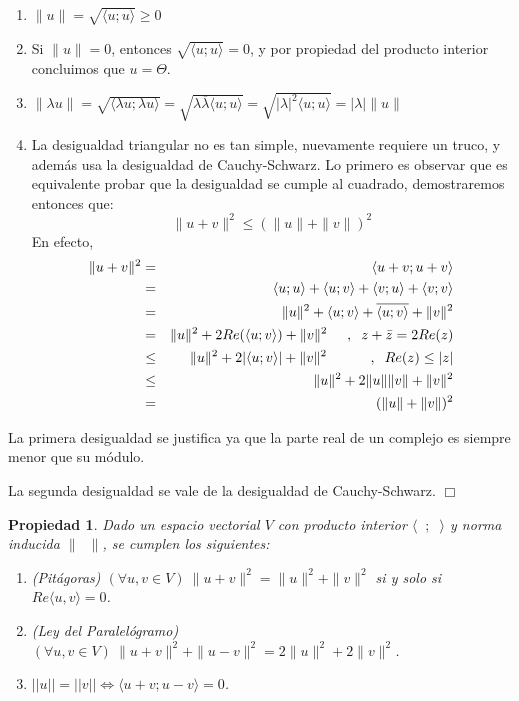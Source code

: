 \documentclass[12pt]{book}
\newtheorem{prop}{Propiedad}
\begin{document}
{ \begin{enumerate}
  \item $\|u\|=\sqrt{\langle u;u\rangle}\ge0$
  \item Si $\|u\|=0$, entonces $\sqrt{\langle u;u\rangle}=0$, y por propiedad del producto interior concluimos que $u=\Theta$.
  \item $\|\lambda u\|=\sqrt{\langle \lambda u;\lambda u\rangle}=\sqrt{\lambda\overline{\lambda}\langle  u; u\rangle}=\sqrt{|\lambda|^2\langle u;u\rangle}=|\lambda|\| u\|$
  \item La desigualdad triangular no es tan simple, nuevamente requiere un truco, y además usa la desigualdad de Cauchy-Schwarz.
    Lo primero es observar que es equivalente probar que la desigualdad se cumple al cuadrado, demostraremos entonces que:
    $$\|u+v\|^2\le (\|u\|+\|v\|)^2$$
    En efecto,
    \begin{eqnarray*}
      \|u+v\|^2&=&\langle u+v;u+v\rangle\\
      &=&\langle u;u\rangle+\langle u;v\rangle+\langle v;u\rangle+\langle v;v\rangle\\
      &=&\|u\|^2+\langle u;v\rangle+\overline{\langle u;v\rangle}+\|v\|^2\\
      &=&\|u\|^2+2Re(\langle u;v\rangle)+\|v\|^2\hspace{0.5 cm},\hspace{0.2 cm}z+\bar{z}=2Re(z)\\
      &\le&\|u\|^2+2|\langle u;v\rangle|+\|v\|^2\hspace{1.1 cm},\hspace{0.2 cm}Re(z)\leq |z|\\
      &\le&\|u\|^2+2\|u\|\|v\|+\|v\|^2\\
      &=&(\|u\|+\|v\|)^2
    \end{eqnarray*}
  \end{enumerate}
  La primera desigualdad se justifica ya que la parte real de un complejo es siempre menor que su módulo.

  La segunda desigualdad se vale de la desigualdad de Cauchy-Schwarz.
  \hfill $\Box$

\vspace{0.3 cm}

\begin{prop}
Dado un espacio vectorial $V$ con producto interior $\langle\phantom{x};\phantom{x}\rangle$ y norma inducida $\|\phantom{x}\|$, se cumplen los siguientes:

\begin{enumerate}
\item {\em (Pitágoras)} $(\forall u,v\in V)\ \| u+v\|^2=\|u\|^2+\|v\|^2 $ si y solo si $Re\langle u,v\rangle=0$.
\item {\em (Ley del Paralelógramo)} $(\forall u,v\in V)\ \| u+v\|^2+\|u-v\|^2=2\|u\|^2+2\|v\|^2$.
\item $||u||=||v||\Leftrightarrow \langle u+v; u-v\rangle=0$.
\end{enumerate}
\end{prop}

}
\end{document}
